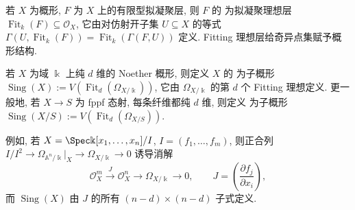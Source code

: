 若 $X$ 为概形, $F$ 为 $X$ 上的有限型拟凝聚层, 则 $F$ 的 为拟凝聚理想层 $\operatorname{Fit}_k(F)\subseteq\mathcal O_X$, 它由对仿射开子集 $U\subseteq X$ 的等式 $\Gamma(U,\operatorname{Fit}_k(F))=\operatorname{Fit}_k(\Gamma(F,U))$ 定义. Fitting 理想层给奇异点集赋予概形结构.
\begin{definition}\label{src:A.3.14}
若 $X$ 为域 $\Bbbk$ 上纯 $d$ 维的 Noether 概形, 则定义 $X$ 的 为子概形 $\operatorname{Sing}(X):=V(\operatorname{Fit}_d(\Omega_{X/\Bbbk}))$, 它由 $\Omega_{X/\Bbbk}$ 的第 $d$ 个 Fitting 理想定义. 更一般地, 若 $X\to S$ 为 fppf 态射, 每条纤维都纯 $d$ 维, 则定义 为子概形 $\operatorname{Sing}(X/S):=V(\operatorname{Fit}_d(\Omega_{X/S}))$.
\end{definition}
例如, 若 $X=\Spec\Bbbk[x_1,\ldots,x_n]/I$, $I=(f_1,\ldots,f_m)$, 则正合列 $I/I^2\to\Omega_{\mathbb A^n/\Bbbk}|_X\to\Omega_{X/\Bbbk}\to0$ 诱导消解
\[
\mathcal O_X^m\xrightarrow{J}\mathcal O_X^n\longrightarrow\Omega_{X/\Bbbk}\longrightarrow0,\qquad J=\left(\frac{\partial f_j}{\partial x_i}\right),
\]
而 $\operatorname{Sing}(X)$ 由 $J$ 的所有 $(n-d)\times(n-d)$ 子式定义.

